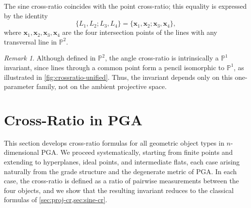 \documentclass{birkjour}
\theoremstyle{definition}
\theoremstyle{remark}
\newtheorem{remark}[theorem]{Remark}
\begin{document}
The sine cross-ratio coincides with the point cross-ratio; this equality is expressed by the identity
\begin{equation}
  \{L_1, L_2; L_3, L_4\}
  = \{\mathbf{x}_1, \mathbf{x}_2; \mathbf{x}_3, \mathbf{x}_4\},
\end{equation}
where $\mathbf{x}_1, \mathbf{x}_2, \mathbf{x}_3, \mathbf{x}_4$ are the four intersection points of the lines with any transversal line in $\mathbb{P}^2$.

\begin{remark}
Although defined in $\mathbb{P}^2$, the angle cross-ratio is intrinsically a $\mathbb{P}^1$ invariant, since lines through a common point form a pencil isomorphic to $\mathbb{P}^1$, as illustrated in \cref{fig:crossratio-unified}.
Thus, the invariant depends only on this one-parameter family, not on the ambient projective space.
\end{remark}





\section{Cross-Ratio in PGA}
\label{sec:pga-cr}
This section develops cross-ratio formulas for all geometric object
types in $n$-dimensional PGA. We proceed systematically, starting
from finite points and extending to hyperplanes, ideal points, and
intermediate flats, each case arising naturally from the grade
structure and the degenerate metric of PGA. In each case, the
cross-ratio is defined as a ratio of pairwise measurements between
the four objects, and we show that the resulting invariant reduces to
the classical formulas of \cref{sec:proj-cr,sec:sine-cr}.

\end{document}
